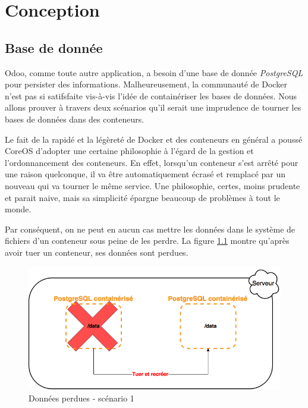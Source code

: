 \chapter{Conception}
\begin{onehalfspace}

\newpage

\section{Base de donnée}


Odoo, comme toute autre application, a besoin d'une base de donnée \emph{PostgreSQL} pour persister des informations. Malheureusement, la communauté de Docker n'est pas si satifsfaite vis-à-vis l'idée de containériser les bases de données. Nous allons prouver à travers deux scénarios qu'il serait une imprudence de tourner les bases de données dans des conteneurs.

Le fait de la rapidé et la légèreté de Docker et des conteneurs en général a poussé CoreOS d'adopter une certaine philosophie à l'égard de la gestion et l'ordonnancement des conteneurs. En effet, lorsqu'un conteneur s'est arrêté pour une raison quelconque, il va être automatiquement écrasé et remplacé par un nouveau qui va tourner le même service. Une philosophie, certes, moins prudente et parait naive, mais sa simplicité épargne beaucoup de problèmes à tout le monde.

Par conséquent, on ne peut en aucun cas mettre les données dans le système de fichiers d'un conteneur sous peine de les perdre. La figure \ref{fig:database1} montre qu'après avoir tuer un conteneur, ses données sont perdues.

\begin{figure}[H]
\centering
\includegraphics [scale=0.5]{chapitre4/assets/database1}
\caption{Données perdues - scénario 1}
\label{fig:database1}
\end{figure}


\end{onehalfspace}
